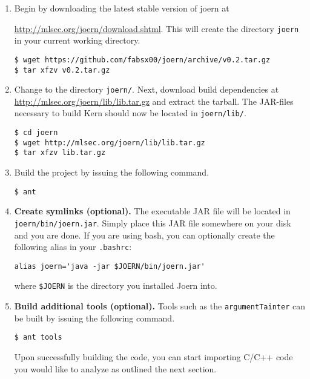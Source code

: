 \documentclass[a4paper]{article}
\newcommand{\code}[1]{\texttt{\small #1}}
\begin{document}
\begin{enumerate}
  
  \item Begin by downloading the latest stable version of joern at
  
    \href{http://mlsec.org/joern/download.shtml}{http://mlsec.org/joern/download.shtml}. This
    will create the directory \code{joern} in your current working
    directory.
\begin{verbatim}
$ wget https://github.com/fabsx00/joern/archive/v0.2.tar.gz
$ tar xfzv v0.2.tar.gz
\end{verbatim}

  \item Change to the directory \code{joern/}. Next, download build
    dependencies at
    \href{http://mlsec.org/joern/lib/lib.tar.gz}{http://mlsec.org/joern/lib/lib.tar.gz}
    and extract the tarball. The JAR-files necessary to build Kern should
    now be located in \code{joern/lib/}.

\begin{verbatim}
$ cd joern
$ wget http://mlsec.org/joern/lib/lib.tar.gz
$ tar xfzv lib.tar.gz
\end{verbatim}
    
  \item Build the project by issuing the following command.
\begin{verbatim}
$ ant
\end{verbatim}

\item \textbf{Create symlinks (optional).} The executable JAR file
  will be located in \code{joern/bin/joern.jar}. Simply place 
this JAR file somewhere on your disk and you are done. If you are
using bash, you can optionally create the following alias in  your
\code{.bashrc}:
\begin{verbatim}
alias joern='java -jar $JOERN/bin/joern.jar'
\end{verbatim}  

where \code{\$JOERN} is the directory you installed Joern into.

\item \textbf{Build additional tools (optional).} Tools such as the
  \code{argumentTainter} can be built by issuing the following
  command.
  \begin{verbatim}
$ ant tools
\end{verbatim}

Upon successfully building the code, you can start importing C/C++
code you would like to analyze as outlined the next section.

\end{enumerate}
\end{document}
